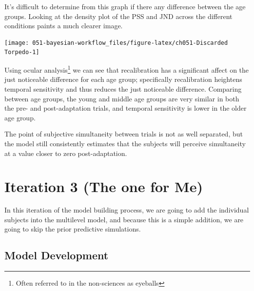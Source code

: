 \documentclass[11pt, oneside, openany]{scrbook}
\begin{document}
It's difficult to determine from this graph if there any difference between the age groups. Looking at the density plot of the PSS and JND across the different conditions paints a much clearer image.

\begin{center}\texttt{[image: 051-bayesian-workflow\_files/figure-latex/ch051-Discarded Torpedo-1]} \end{center}

Using ocular analysis\footnote{Often referred to in the non-sciences as eyeballs} we can see that recalibration has a significant affect on the just noticeable difference for each age group; specifically recalibration heightens temporal sensitivity and thus reduces the just noticeable difference. Comparing between age groups, the young and middle age groups are very similar in both the pre- and post-adaptation trials, and temporal sensitivity is lower in the older age group.

The point of subjective simultaneity between trials is not as well separated, but the model still consistently estimates that the subjects will perceive simultaneity at a value closer to zero post-adaptation.

\hypertarget{iter3}{%
\section{Iteration 3 (The one for Me)}\label{iter3}}

In this iteration of the model building process, we are going to add the individual subjects into the multilevel model, and because this is a simple addition, we are going to skip the prior predictive simulations.

\hypertarget{iter3-model-dev}{%
\subsection{Model Development}\label{iter3-model-dev}}
\end{document}
